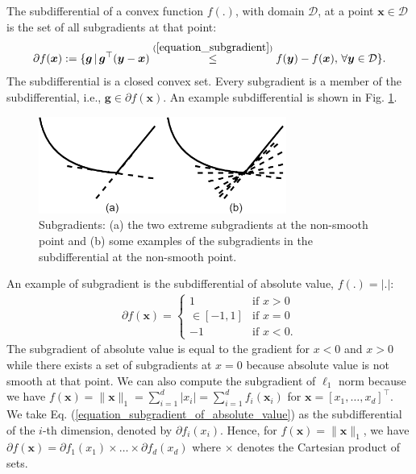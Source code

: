 \documentclass[lang=cn,10pt]{gorgeousnbook}
\numberwithin{equation}{section}%
\numberwithin{figure}{section}%
\begin{document}
\begin{definition}[subdifferential]
The subdifferential of a convex function $f(.)$, with domain $\mathcal{D}$, at a point $\boldsymbol{x} \in \mathcal{D}$ is the set of all subgradients at that point:
\begin{align}
\partial f(\boldsymbol{x}) := \{\boldsymbol{g}\, |\, \boldsymbol{g}^\top (\boldsymbol{y} - \boldsymbol{x}) \overset{(\ref{equation_subgradient})}{\leq} f(\boldsymbol{y}) - f(\boldsymbol{x}),\, \forall \boldsymbol{y} \in \mathcal{D}\}.
\end{align}
The subdifferential is a closed convex set. Every subgradient is a member of the subdifferential, i.e., $\boldsymbol{g} \in \partial f(\boldsymbol{x})$. An example subdifferential is shown in Fig. \ref{figure_subgradient}.
\end{definition}

\begin{figure}[!t]
\centering
\includegraphics[width=3.2in]{./images/subgradient}
\caption{Subgradients: (a) the two extreme subgradients at the non-smooth point and (b) some examples of the subgradients in the subdifferential at the non-smooth point.}
\label{figure_subgradient}
\end{figure}

An example of subgradient is the subdifferential of absolute value, $f(.) = |.|$:
\begin{align}\label{equation_subgradient_of_absolute_value}
\partial f(\boldsymbol{x}) =
\left\{
    \begin{array}{ll}
        1 & \mbox{if } x > 0 \\
        \in [-1,1] & \mbox{if } x = 0 \\
        -1 & \mbox{if } x < 0. 
    \end{array}
\right. 
\end{align}
The subgradient of absolute value is equal to the gradient for $x<0$ and $x>0$ while there exists a set of subgradients at $x=0$ because absolute value is not smooth at that point. 
We can also compute the subgradient of $\ell_1$ norm because we have $f(\boldsymbol{x}) = \|\boldsymbol{x}\|_1 = \sum_{i=1}^d |x_i| = \sum_{i=1}^d f_i(\boldsymbol{x}_i)$ for $\boldsymbol{x} = [x_1, \dots, x_d]^\top$.
We take Eq. (\ref{equation_subgradient_of_absolute_value}) as the subdifferential of the $i$-th dimension, denoted by $\partial f_i(x_i)$. Hence, for $f(\boldsymbol{x}) = \|\boldsymbol{x}\|_1$, we have $\partial f(\boldsymbol{x}) = \partial f_1(x_1) \times \dots \times \partial f_d(x_d)$ where $\times$ denotes the Cartesian product of sets.
\end{document}

